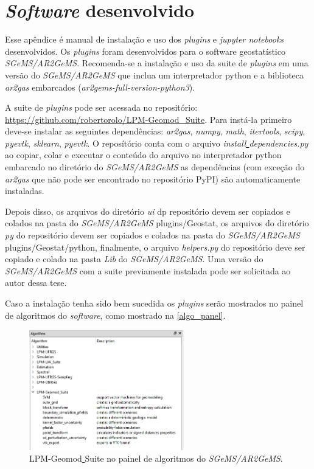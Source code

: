 \chapter{\textit{Software} desenvolvido} \label{software}

Esse apêndice é manual de instalação e uso dos \textit{plugins} e \textit{jupyter notebooks} desenvolvidos. Os \textit{plugins} foram desenvolvidos para o software geostatístico \textit{SGeMS/AR2GeMS}. Recomenda-se a instalação e uso da suite de \textit{plugins} em uma versão do \textit{SGeMS/AR2GeMS} que inclua um interpretador python e a biblioteca \textit{ar2gas} embarcados (\textit{ar2gems-full-version-python3}).

A suite de \textit{plugins} pode ser acessada no repositório: \url{https://github.com/robertorolo/LPM-Geomod_Suite}. Para instá-la primeiro deve-se instalar as seguintes dependências: \textit{ar2gas}, \textit{numpy}, \textit{math}, \textit{itertools}, \textit{scipy}, \textit{pyevtk}, \textit{sklearn}, \textit{pyevtk}. O reposítório conta com o arquivo \textit{install\underline{ }dependencies.py} ao copiar, colar e executar o conteúdo do arquivo no interpretador python embarcado no diretório do \textit{SGeMS/AR2GeMS} as dependências (com exceção do \textit{ar2gas} que não pode ser encontrado no repositório PyPI) são automaticamente instaladas.

Depois disso, os arquivos do diretório \textit{ui} dp repositório devem ser copiados e colados na pasta do \textit{SGeMS/AR2GeMS} plugins/Geostat, os arquivos do diretório \textit{py} do repositório devem ser copiados e colados na pasta do \textit{SGeMS/AR2GeMS} plugins/Geostat/python, finalmente, o arquivo \textit{helpers.py} do repositório deve ser copiado e colado na pasta \textit{Lib} do \textit{SGeMS/AR2GeMS}. Uma versão do \textit{SGeMS/AR2GeMS} com a suite previamente instalada pode ser solicitada ao autor dessa tese.

Caso a instalação tenha sido bem sucedida os \textit{plugins} serão mostrados no painel de algoritmos do \textit{software}, como mostrado na \autoref{algo_panel}.

\begin{figure}[H]
	\caption{\label{algo_panel} LPM-Geomod\underline{ }Suite no painel de algoritmos do \textit{SGeMS/AR2GeMS}.}
	\centering
		\includegraphics[width=0.6\textwidth]{apendice/imagens/algorithms.PNG}
\end{figure}

